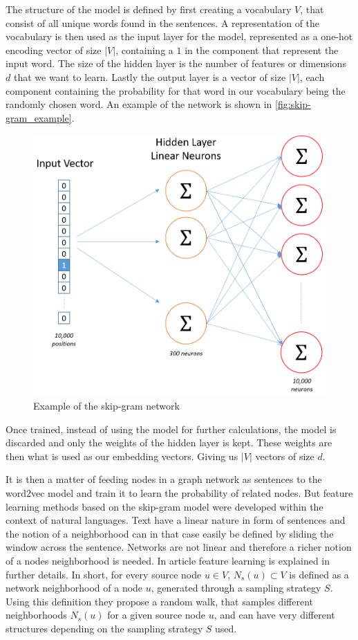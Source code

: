 The structure of the model is defined by first creating a vocabulary $V$, that consist of all unique words found in the sentences. A representation of the vocabulary is then used as the input layer for the model, represented as a one-hot encoding vector of size $|V|$, containing a $1$ in the component that represent the input word. The size of the hidden layer is the number of features or dimensions $d$ that we want to learn. Lastly the output layer is a vector of size $|V|$, each component containing the probability for that word in our vocabulary being the randomly chosen word. An example of the network is shown in \autoref{fig:skip-gram_example}.

\begin{figure}[H]
\centering
  \includegraphics[width=\linewidth]{Article/figures/skip_gram_net_arch.png}
  \caption{Example of the skip-gram network \cite{Word2vec}}
  \label{fig:skip-gram_example}
\end{figure}

Once trained, instead of using the model for further calculations, the model is discarded and only the weights of the hidden layer is kept. These weights are then what is used as our embedding vectors. Giving us $|V|$ vectors of size $d$.

It is then a matter of feeding nodes in a graph network as sentences to the word2vec model and train it to learn the probability of related nodes. But feature learning methods based on the skip-gram model were developed within the context of natural languages. Text have a linear nature in form of sentences and the notion of a neighborhood can in that case easily be defined by sliding the window across the sentence. Networks are not linear and therefore a richer notion of a nodes neighborhood is needed.
In article \cite{Node2vec} feature learning is explained in further details. In short, for every source node $u \in V$, $N_s (u) \subset V$ is defined as a network neighborhood of a node $u$, generated through a sampling strategy $S$. Using this definition they propose a random walk, that samples different neighborhoods $N_s (u)$ for a given source node $u$, and can have very different structures depending on the sampling strategy $S$ used.

